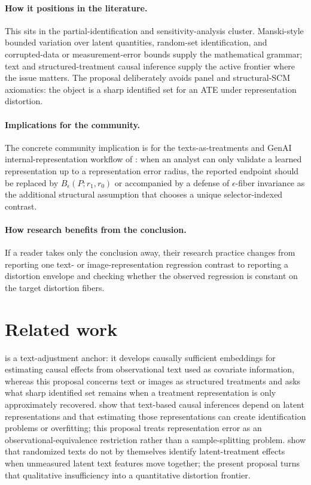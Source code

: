 \documentclass[11pt]{article}
\theoremstyle{definition}
\theoremstyle{plain}
\theoremstyle{remark}
\begin{document}
\paragraph{How it positions in the literature.}
This sits in the partial-identification and sensitivity-analysis cluster.  Manski-style bounded variation over latent quantities, random-set identification, and corrupted-data or measurement-error bounds supply the mathematical grammar; text and structured-treatment causal inference supply the active frontier where the issue matters.  The proposal deliberately avoids panel and structural-SCM axiomatics: the object is a sharp identified set for an ATE under representation distortion.

\paragraph{Implications for the community.}
The concrete community implication is for the texts-as-treatments and GenAI internal-representation workflow of \citet{ImaiNakamura2024TextTreatments}: when an analyst can only validate a learned representation up to a representation error radius, the reported endpoint should be replaced by \(B_\epsilon(P;r_1,r_0)\) or accompanied by a defense of \(\epsilon\)-fiber invariance as the additional structural assumption that chooses a unique selector-indexed contrast.

\paragraph{How research benefits from the conclusion.}
If a reader takes only the conclusion away, their research practice changes from reporting one text- or image-representation regression contrast to reporting a distortion envelope and checking whether the observed regression is constant on the target distortion fibers.

\section{Related work}
\citet{VeitchSridharBlei2020} is a text-adjustment anchor: it develops causally sufficient embeddings for estimating causal effects from observational text used as covariate information, whereas this proposal concerns text or images as structured treatments and asks what sharp identified set remains when a treatment representation is only approximately recovered.  \citet{EgamiFongGrimmerRobertsStewart2022} show that text-based causal inferences depend on latent representations and that estimating those representations can create identification problems or overfitting; this proposal treats representation error as an observational-equivalence restriction rather than a sample-splitting problem.  \citet{FongGrimmer2023} show that randomized texts do not by themselves identify latent-treatment effects when unmeasured latent text features move together; the present proposal turns that qualitative insufficiency into a quantitative distortion frontier.
\end{document}
